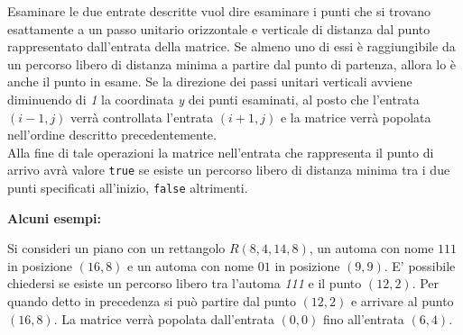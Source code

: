 \documentclass[a4paper,11pt]{article}
\begin{document}
Esaminare le due entrate descritte vuol dire esaminare i punti che si trovano esattamente a un passo unitario orizzontale e verticale di distanza dal punto rappresentato dall'entrata della matrice. Se almeno uno di essi è raggiungibile da un percorso libero di distanza minima a partire dal punto di partenza, allora lo è anche il punto in esame. Se la direzione dei passi unitari verticali avviene diminuendo di \textit{1} la coordinata \textit{y} dei punti esaminati, al posto che l'entrata $(i-1, j)$ verrà controllata l'entrata $(i+1, j)$ e la matrice verrà popolata nell'ordine descritto precedentemente. \\
Alla fine di tale operazioni la matrice nell'entrata che rappresenta il punto di arrivo avrà valore \texttt{true} se esiste un percorso libero di distanza minima tra i due punti specificati all'inizio, \texttt{false} altrimenti. 

\textbf{Alcuni esempi:}

Si consideri un piano con un rettangolo $R(8, 4, 14, 8)$, un automa con nome $111$ in posizione $(16, 8)$ e un automa con nome $01$ in posizione $(9, 9)$. E' possibile chiedersi se esiste un percorso libero tra l'automa \textit{111} e il punto $(12, 2)$. Per quando detto in precedenza si può partire dal punto $(12, 2)$ e arrivare al punto $(16, 8)$. La matrice verrà popolata dall'entrata $(0, 0)$ fino all'entrata $(6, 4)$.
\end{document}
